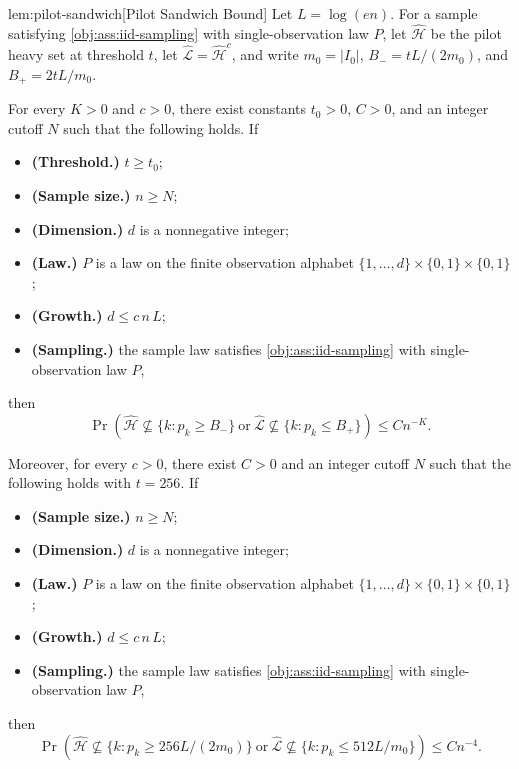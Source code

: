 \begin{lemmav}{lem:pilot-sandwich}[Pilot Sandwich Bound]
Let \(L=\log(en)\). For a sample satisfying \cref{obj:ass:iid-sampling} with single-observation law \(P\), let \(\widehat{\mathcal H}\) be the pilot heavy set at threshold \(t\), let \(\widehat{\mathcal L}=\widehat{\mathcal H}^{c}\), and write \(m_0=|I_0|\), \(B_-=tL/(2m_0)\), and \(B_+=2tL/m_0\).

For every \(K>0\) and \(c>0\), there exist constants \(t_0>0\), \(C>0\), and an integer cutoff \(N\) such that the following holds. If
\begin{itemize}
\item \textbf{(Threshold.)} \(t\ge t_0\);
\item \textbf{(Sample size.)} \(n\ge N\);
\item \textbf{(Dimension.)} \(d\) is a nonnegative integer;
\item \textbf{(Law.)} \(P\) is a law on the finite observation alphabet \(\{1,\ldots,d\}\times\{0,1\}\times\{0,1\}\);
\item \textbf{(Growth.)} \(d\le c\,n\,L\);
\item \textbf{(Sampling.)} the sample law satisfies \cref{obj:ass:iid-sampling} with single-observation law \(P\),
\end{itemize}
then
\[
\Pr\!\left(\widehat{\mathcal H}\not\subseteq\{k:p_k\ge B_-\}\ \text{or}\ \widehat{\mathcal L}\not\subseteq\{k:p_k\le B_+\}\right)
\le C n^{-K}.
\]

Moreover, for every \(c>0\), there exist \(C>0\) and an integer cutoff \(N\) such that the following holds with \(t=256\). If
\begin{itemize}
\item \textbf{(Sample size.)} \(n\ge N\);
\item \textbf{(Dimension.)} \(d\) is a nonnegative integer;
\item \textbf{(Law.)} \(P\) is a law on the finite observation alphabet \(\{1,\ldots,d\}\times\{0,1\}\times\{0,1\}\);
\item \textbf{(Growth.)} \(d\le c\,n\,L\);
\item \textbf{(Sampling.)} the sample law satisfies \cref{obj:ass:iid-sampling} with single-observation law \(P\),
\end{itemize}
then
\[
\Pr\!\left(\widehat{\mathcal H}\not\subseteq\{k:p_k\ge 256L/(2m_0)\}\ \text{or}\ \widehat{\mathcal L}\not\subseteq\{k:p_k\le 512L/m_0\}\right)
\le C n^{-4}.
\]
\end{lemmav}

